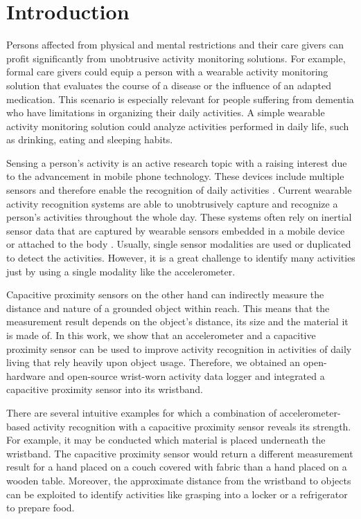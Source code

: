 \documentclass[runningheads,a4paper]{llncs}
\begin{document}
\section{Introduction}

Persons affected from physical and mental restrictions and their care givers can profit significantly from unobtrusive activity monitoring solutions. For example, formal care givers could equip a person with a wearable activity monitoring solution that evaluates the course of a disease or the influence of an adapted medication. This scenario is especially relevant for people suffering from dementia who have limitations in organizing their daily activities. A simple wearable activity monitoring solution could analyze activities performed in daily life, such as drinking, eating and sleeping habits. 

Sensing a person's activity is an active research topic with a raising interest due to the advancement in mobile phone technology. These devices include multiple sensors and therefore enable the recognition of daily activities \cite{brezmes2009activity}. Current wearable activity recognition systems are able to unobtrusively capture and recognize a person's activities throughout the whole day. These systems often rely on inertial sensor data that are captured by wearable sensors embedded in a mobile device \cite{brezmes2009activity} or attached to the body \cite{Ravi2005}. Usually, single sensor modalities are used or duplicated to detect the activities. However, it is a great challenge to identify many activities just by using a single modality like the accelerometer.

Capacitive proximity sensors on the other hand can indirectly measure the distance and nature of a grounded object within reach. This means that the measurement result depends on the object's distance, its size and the material it is made of. In this work, we show that an accelerometer and a capacitive proximity sensor can be used to improve activity recognition in activities of daily living that rely heavily upon object usage. Therefore, we obtained an open-hardware and open-source wrist-worn activity data logger \cite{hedgehog} and integrated a capacitive proximity sensor into its wristband. 

There are several intuitive examples for which a combination of accelerometer-based activity recognition with a capacitive proximity sensor reveals its strength. For example, it may be conducted which material is placed underneath the wristband. The capacitive proximity sensor would return a different measurement result for a hand placed on a couch covered with fabric than a hand placed on a wooden table. Moreover, the approximate distance from the wristband to objects can be exploited to identify activities like grasping into a locker or a refrigerator to prepare food.
\end{document}
